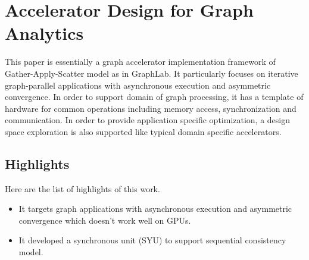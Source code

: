 \section{Accelerator Design for Graph Analytics}
This paper is essentially a graph accelerator implementation framework of Gather-Apply-Scatter model as in
GraphLab. It particularly focuses on iterative graph-parallel applications with asynchronous
execution and asymmetric convergence. In order to support domain of graph processing, it has a
template of hardware for common operations including memory access, synchronization and
communication. In order to provide application specific optimization, a design space exploration is
also supported like typical domain specific accelerators.

\subsection{Highlights}
Here are the list of highlights of this work.
\begin{itemize}
    \item It targets graph applications with asynchronous execution and asymmetric convergence which
        doesn't work well on GPUs.
    \item It developed a synchronous unit (SYU) to support sequential consistency model. 
\end{itemize}
